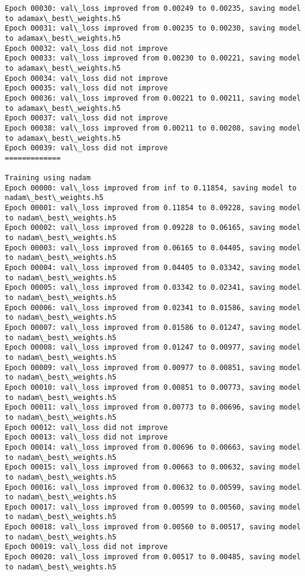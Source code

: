 \documentclass[11pt]{article}
\begin{document}
\begin{Verbatim}[commandchars=\\\{\}]
Epoch 00030: val\_loss improved from 0.00249 to 0.00235, saving model to adamax\_best\_weights.h5
Epoch 00031: val\_loss improved from 0.00235 to 0.00230, saving model to adamax\_best\_weights.h5
Epoch 00032: val\_loss did not improve
Epoch 00033: val\_loss improved from 0.00230 to 0.00221, saving model to adamax\_best\_weights.h5
Epoch 00034: val\_loss did not improve
Epoch 00035: val\_loss did not improve
Epoch 00036: val\_loss improved from 0.00221 to 0.00211, saving model to adamax\_best\_weights.h5
Epoch 00037: val\_loss did not improve
Epoch 00038: val\_loss improved from 0.00211 to 0.00208, saving model to adamax\_best\_weights.h5
Epoch 00039: val\_loss did not improve
=============

Training using nadam
Epoch 00000: val\_loss improved from inf to 0.11854, saving model to nadam\_best\_weights.h5
Epoch 00001: val\_loss improved from 0.11854 to 0.09228, saving model to nadam\_best\_weights.h5
Epoch 00002: val\_loss improved from 0.09228 to 0.06165, saving model to nadam\_best\_weights.h5
Epoch 00003: val\_loss improved from 0.06165 to 0.04405, saving model to nadam\_best\_weights.h5
Epoch 00004: val\_loss improved from 0.04405 to 0.03342, saving model to nadam\_best\_weights.h5
Epoch 00005: val\_loss improved from 0.03342 to 0.02341, saving model to nadam\_best\_weights.h5
Epoch 00006: val\_loss improved from 0.02341 to 0.01586, saving model to nadam\_best\_weights.h5
Epoch 00007: val\_loss improved from 0.01586 to 0.01247, saving model to nadam\_best\_weights.h5
Epoch 00008: val\_loss improved from 0.01247 to 0.00977, saving model to nadam\_best\_weights.h5
Epoch 00009: val\_loss improved from 0.00977 to 0.00851, saving model to nadam\_best\_weights.h5
Epoch 00010: val\_loss improved from 0.00851 to 0.00773, saving model to nadam\_best\_weights.h5
Epoch 00011: val\_loss improved from 0.00773 to 0.00696, saving model to nadam\_best\_weights.h5
Epoch 00012: val\_loss did not improve
Epoch 00013: val\_loss did not improve
Epoch 00014: val\_loss improved from 0.00696 to 0.00663, saving model to nadam\_best\_weights.h5
Epoch 00015: val\_loss improved from 0.00663 to 0.00632, saving model to nadam\_best\_weights.h5
Epoch 00016: val\_loss improved from 0.00632 to 0.00599, saving model to nadam\_best\_weights.h5
Epoch 00017: val\_loss improved from 0.00599 to 0.00560, saving model to nadam\_best\_weights.h5
Epoch 00018: val\_loss improved from 0.00560 to 0.00517, saving model to nadam\_best\_weights.h5
Epoch 00019: val\_loss did not improve
Epoch 00020: val\_loss improved from 0.00517 to 0.00485, saving model to nadam\_best\_weights.h5

\end{Verbatim}
\end{document}
